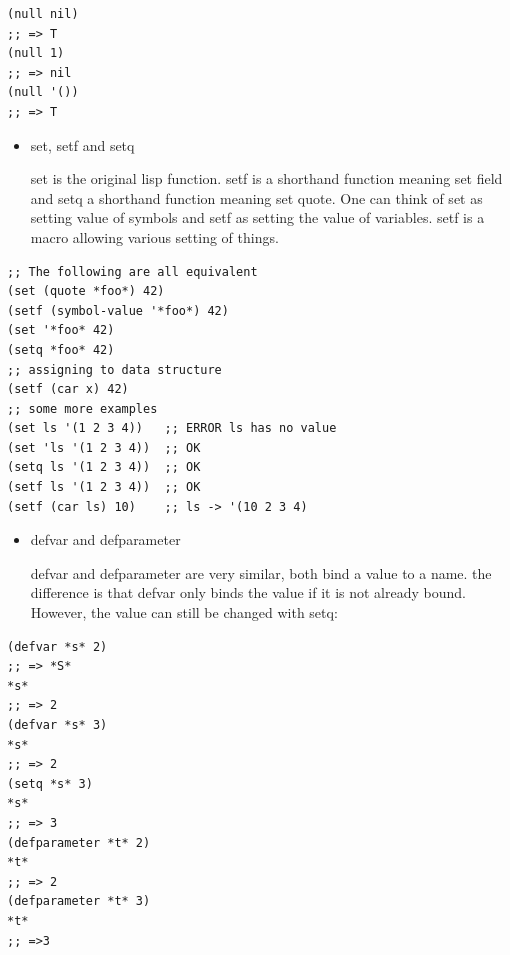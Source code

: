 \documentclass[11pt]{article}
\begin{document}
\begin{verbatim}
(null nil)
;; => T
(null 1)
;; => nil
(null '())
;; => T
\end{verbatim}

\begin{itemize}
\item set, setf and setq

set is the original lisp function. setf is a shorthand function
meaning set field and setq a shorthand function meaning
set quote. One can think of set as setting value of symbols and
setf as setting the value of variables. setf is a macro allowing
various setting of things.
\end{itemize}

\begin{verbatim}
;; The following are all equivalent
(set (quote *foo*) 42)
(setf (symbol-value '*foo*) 42)
(set '*foo* 42)
(setq *foo* 42)
;; assigning to data structure
(setf (car x) 42)
;; some more examples
(set ls '(1 2 3 4))   ;; ERROR ls has no value
(set 'ls '(1 2 3 4))  ;; OK
(setq ls '(1 2 3 4))  ;; OK
(setf ls '(1 2 3 4))  ;; OK
(setf (car ls) 10)    ;; ls -> '(10 2 3 4)
\end{verbatim}

\begin{itemize}
\item defvar and defparameter

defvar and defparameter are very similar, both bind a value to a
name. the difference is that defvar only binds the value if it is
not already bound. However, the value can still be changed with
setq:
\end{itemize}

\begin{verbatim}
(defvar *s* 2)
;; => *S*
*s*
;; => 2
(defvar *s* 3)
*s*
;; => 2
(setq *s* 3)
*s*
;; => 3
(defparameter *t* 2)
*t*
;; => 2
(defparameter *t* 3)
*t*
;; =>3
\end{verbatim}
\end{document}
